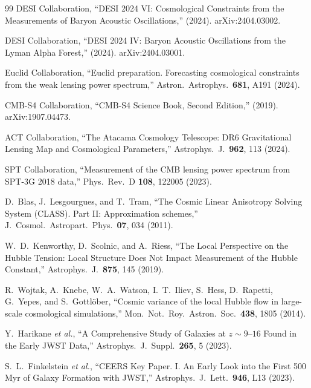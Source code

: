 \documentclass[aps,prd,twocolumn,superscriptaddress,nofootinbib]{revtex4-2}
\begin{document}
\begin{thebibliography}{99}
DESI Collaboration,
``DESI 2024 VI: Cosmological Constraints from the Measurements of
Baryon Acoustic Oscillations,''
(2024). arXiv:2404.03002.

DESI Collaboration,
``DESI 2024 IV: Baryon Acoustic Oscillations from the Lyman Alpha
Forest,''
(2024). arXiv:2404.03001.

Euclid Collaboration,
``Euclid preparation. Forecasting cosmological constraints from the
weak lensing power spectrum,''
Astron.\ Astrophys.\ \textbf{681}, A191 (2024).

CMB-S4 Collaboration,
``CMB-S4 Science Book, Second Edition,''
(2019). arXiv:1907.04473.

ACT Collaboration,
``The Atacama Cosmology Telescope: DR6 Gravitational Lensing Map and
Cosmological Parameters,''
Astrophys.\ J.\ \textbf{962}, 113 (2024).

SPT Collaboration,
``Measurement of the CMB lensing power spectrum from SPT-3G 2018
data,''
Phys.\ Rev.\ D \textbf{108}, 122005 (2023).

D.~Blas, J.~Lesgourgues, and T.~Tram,
``The Cosmic Linear Anisotropy Solving System (CLASS). Part II:
Approximation schemes,''
J.\ Cosmol.\ Astropart.\ Phys.\ \textbf{07}, 034 (2011).

W.~D.~Kenworthy, D.~Scolnic, and A.~Riess,
``The Local Perspective on the Hubble Tension: Local Structure Does
Not Impact Measurement of the Hubble Constant,''
Astrophys.\ J.\ \textbf{875}, 145 (2019).

R.~Wojtak, A.~Knebe, W.~A.~Watson, I.~T.~Iliev, S.~Hess, D.~Rapetti,
G.~Yepes, and S.~Gottl\"ober,
``Cosmic variance of the local Hubble flow in large-scale cosmological
simulations,''
Mon.\ Not.\ Roy.\ Astron.\ Soc.\ \textbf{438}, 1805 (2014).

Y.~Harikane \textit{et al.},
``A Comprehensive Study of Galaxies at $z \sim 9$--$16$ Found in the
Early JWST Data,''
Astrophys.\ J.\ Suppl.\ \textbf{265}, 5 (2023).

S.~L.~Finkelstein \textit{et al.},
``CEERS Key Paper. I. An Early Look into the First 500 Myr of Galaxy
Formation with JWST,''
Astrophys.\ J.\ Lett.\ \textbf{946}, L13 (2023).

\end{thebibliography}
\end{document}
